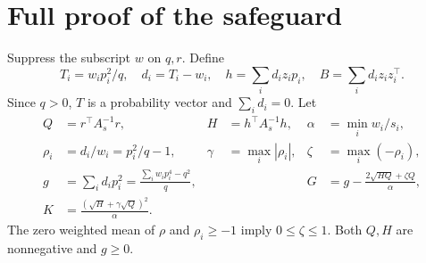 \documentclass[11pt]{article}
\begin{document}
\section{Full proof of the safeguard}
Suppress the subscript $w$ on $q,r$. Define
\[
 T_i=w_i p_i^2/q,\quad d_i=T_i-w_i,\quad
 h=\sum_i d_i z_i p_i,\quad B=\sum_i d_i z_i z_i^\top.
\]
Since $q>0$, $T$ is a probability vector and $\sum_i d_i=0$.
Let
\begin{align*}
 Q&=r^\top A_s^{-1}r,&H&=h^\top A_s^{-1}h,&
 \alpha&=\min_i w_i/s_i,\\
 \rho_i&=d_i/w_i=p_i^2/q-1,&
 \gamma&=\max_i|\rho_i|,&\zeta&=\max_i(-\rho_i),\\
 g&=\sum_i d_i p_i^2
 =\frac{\sum_iw_ip_i^4-q^2}{q},&&&
 G&=g-\frac{2\sqrt{HQ}+\zeta Q}{\alpha},\\
 K&=\frac{(\sqrt H+\gamma\sqrt Q)^2}{\alpha}.&&&&
\end{align*}
The zero weighted mean of $\rho$ and $\rho_i\ge-1$ imply $0\le\zeta\le1$. Both $Q,H$ are nonnegative and $g\ge0$.
\end{document}
